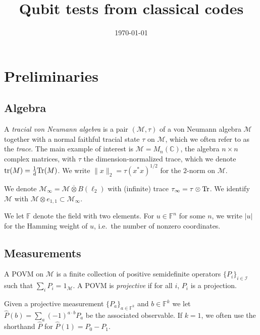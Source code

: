 \documentclass[11pt]{article}
\theoremstyle{definition}
\newcommand{\Tr}{\mbox{\rm Tr}}
\newcommand{\field}{\mathbb{F}}
\newcommand{\C}{\ensuremath{\mathbb{C}}}
\newcommand{\F}{\ensuremath{\mathbb{F}}}
\newcommand{\mM}{\ensuremath{\mathcal{M}}}
\newcommand{\mI}{\ensuremath{\mathcal{I}}}
\DeclareMathOperator{\tr}{tr}
\begin{document}
\title{Qubit tests from classical codes}

\author{}
\date{\today}
\maketitle

\noteswarning


\begin{abstract}

\end{abstract}

	\section{Preliminaries}

\subsection{Algebra}

  A \emph{tracial von Neumann algebra} is a pair $(\mM,\tau)$ of a von Neumann algebra $\mM$ together with a normal faithful tracial state $\tau$ on $\mM$, which we often refer to as the \emph{trace}. The main example of interest is $\mM=M_n(\C)$, the algebra $n\times n$ complex matrices, with $\tau$ the dimension-normalized trace, which we denote $\tr(M)=\frac{1}{d}\Tr(M)$. 	We write $\|x\|_2=\tau(x^*x)^{1/2}$ for the $2$-norm on $\mM$.
	
	We denote $\mM_\infty = \mM \overline{\otimes} B(\ell_2)$ with (infinite) trace $\tau_\infty = \tau \otimes \Tr$. We identify $\mM$ with $\mM\otimes e_{1,1}\subset \mM_\infty$. 

	We let $\field$ denote the field with two elements. For $u\in \F^n$ for some $n$, we write $|u|$ for the Hamming weight of $u$, i.e.\ the number of nonzero coordinates. 
	
	
	\subsection{Measurements}
	
	A POVM on $\mM$ is a finite collection of positive semidefinite operators $\{P_i\}_{i\in \mI}$ such that $\sum_i P_i = 1_\mM$. A POVM is \emph{projective} if for all $i$, $P_i$ is a projection. 
	
	Given a projective measurement $\{P_a\}_{a\in \field^k}$ and $b\in \field^k$ we let $\widehat{P}(b) = \sum_a (-1)^{a\cdot b} P_a$ be the associated observable. If $k=1$, we often use the shorthand $\widehat{P}$ for $\widehat{P}(1) = P_0-P_1$.
	
\end{document}
